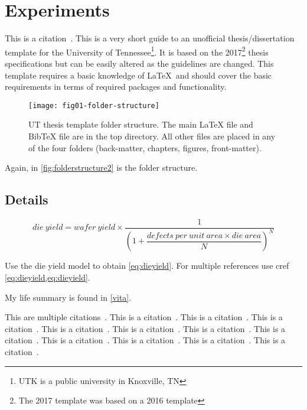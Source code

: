 \chapter{Experiments} \label{chapter2}

This is a citation~\cite{utk:idr2016optimization}.
This is a very short guide to an unofficial thesis/dissertation template
for the University of Tennessee\footnote{UTK is a public university in Knoxville,
TN}.
It is based on the 2017\footnote{The 2017 template was based on a 2016 template} thesis specifications but can be easily altered
as the guidelines are changed.
This template requires a basic knowledge of \LaTeX\ and should cover
the basic requirements in terms of required packages and functionality.

\begin{figure}[!htb]
    \Centering
    \texttt{[image: fig01-folder-structure]}
    \caption[UT thesis template folder structure]{UT thesis template folder structure.
        The main LaTeX file and BibTeX file are in the top directory.
        All other files are placed in any of the four folders
        (back-matter, chapters, figures, front-matter).}
    \label{fig:folderstructure2}
\end{figure}

Again, in \autoref{fig:folderstructure2} is the folder structure.

\section{Details} \label{details}

\begin{equation}
    die\ yield = wafer\ yield \times \dfrac{1}{\left(1 + \dfrac{defects\ per\ unit\ area \times die\ area}{N}\right)^N}
    \label{eq:dieyield}
\end{equation}

Use the die yield model to obtain \cref{eq:dieyield}.
For multiple references use cref \cref{eq:dieyield,eq:dieyield}.

My life summary is found in \autoref{vita}.

This are multiple citations~\cite{utk:rdf2018jac,utk:hspwrap2015blast,pupr:plasma2014fpga,ornl:sensorfusion2012}.
This is a citation~\cite{ornl:dmrg2011}.
This is a citation~\cite{caaqa2017appsol}.
This is a citation~\cite{caaqa2017}.
This is a citation~\cite{ornl:poplar2014gateway}.
This is a citation~\cite{utk:hspwrap2014blast}.
This is a citation~\cite{ornl:async2012gpu}.
This is a citation~\cite{ornl:async2011gpu}.
This is a citation~\cite{ornl:dmrg2010}.
This is a citation~\cite{ornl:ipcc2009}.
This is a citation~\cite{utk:idr2015cohpc}.
This is a citation~\cite{pupr:chair2010icste}.

